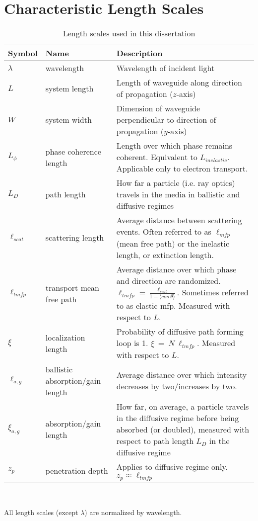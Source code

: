 \chapter{Characteristic Length Scales}
\label{sec:lengths}

\captionsetup[table]{list=no}
\begin{table} %
\caption{Length scales used in this dissertation}
\begin{tabular}{|l|p{4cm}|p{8.5cm}|}
\hline Symbol & Name & Description \\ \hline
$\lambda$ & wavelength & Wavelength of incident light \\ 
$L$ &  system length & Length of waveguide along direction of propagation ($z$-axis) \\ 
$W$ & system width & Dimension of waveguide perpendicular to direction of propagation ($y$-axis) \\
$L_{\phi}$ & phase coherence length & Length over which phase remains coherent. Equivalent to $L_{inelastic}$\cite{1988_Stone,1986_Imry}. Applicable only to electron transport. \\
$L_D$ & path length & How far a particle (i.e. ray optics) travels in the media in ballistic and diffusive regimes \\
$\ell_{scat}$ & scattering length & Average distance between scattering events. Often referred to as $\ell_{mfp}$ (mean free path) or the inelastic length\cite{1984_John_prl}, or extinction length\cite{1999_van_Tiggelen}. \\ 
$\ell_{tmfp}$ & transport mean free path & Average distance over which phase and direction are randomized.  $\ell_{tmfp} = \frac{\ell_{scat}}{1-\langle cos\ \theta \rangle}$. Sometimes referred to as elastic mfp\cite{1991_John}. %
Measured with respect to $L$. \\ 
$\xi$ & localization length & Probability of diffusive path forming loop is 1. $\xi~=~N~\ell_{tmfp}$. Measured with respect to $L$. \\ 
$\ell_{a,g}$ & ballistic absorption/gain length & Average distance over which intensity decreases by two/increases by two. \\
$\xi_{a,g}$ & absorption/gain length & How far, on average, a particle travels in the diffusive regime before being absorbed (or doubled), measured with respect to path length $L_D$ in the diffusive regime \\ 
$z_p$ & penetration depth & Applies to diffusive regime only. $z_p \approx \ell_{tmfp}$ \\ 
\hline
\end{tabular}

\ \\ 

\label{tabl:lengths}
\end{table}
All length scales (except $\lambda$) are normalized by wavelength. %
